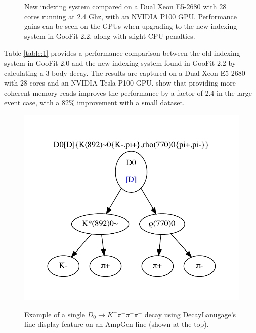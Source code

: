\documentclass{webofc}
\begin{document}
\begin{figure}[h]
	\centering
	\label{figure-newindexspeed}
	\caption{New indexing system compared on a Dual Xeon E5-2680 with 28 cores running at 2.4 Ghz, with an NVIDIA P100 GPU. Performance gains can be seen on the GPUs when upgrading to the new indexing system in GooFit 2.2, along with slight CPU penalties.}
\end{figure}

Table \ref{table:1} provides a performance comparison between the old indexing system in GooFit 2.0 and the new indexing system found in GooFit 2.2 by calculating a 3-body decay. The results are captured on a Dual Xeon E5-2680 with 28 cores and an NVIDIA Tesla P100 GPU. show that providing more coherent memory reads improves the performance by a factor of 2.4 in the large event case, with a 82\% improvement with a small dataset.

\begin{figure}[ht]
	\centering
	\includegraphics[width=.5\textwidth]{LineExample}
	\label{figure-ampgen}
	\caption{Example of a single $D_0 \rightarrow K^{-} \pi^{+} \pi^{+} \pi^{-}$ decay using DecayLanugage's line display feature on an AmpGen line (shown at the top).}
\end{figure}
\end{document}
